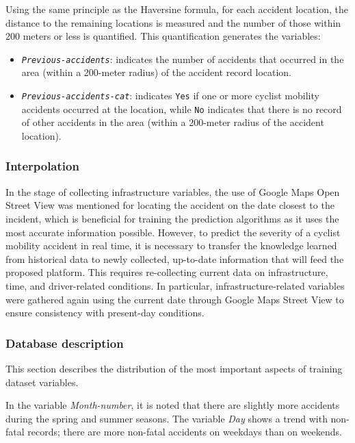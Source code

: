 \documentclass[preprint,12pt]{elsarticle}
\begin{document}
Using the same principle as the Haversine formula, for each accident location, the distance to the remaining locations is measured and the number of those within 200 meters or less is quantified. This quantification generates the variables:
\begin{itemize}
    \item \textit{\texttt{Previous-accidents}}: indicates the number of accidents that occurred in the area (within a 200-meter radius) of the accident record location.
    \item \textit{\texttt{Previous-accidents-cat}}: indicates \texttt{Yes} if one or more cyclist mobility accidents occurred at the location, while \texttt{No} indicates that there is no record of other accidents in the area (within a 200-meter radius of the accident location).
  \end{itemize}




\subsubsection{Interpolation}
In the stage of collecting infrastructure variables, the use of Google Maps Open Street View was mentioned for locating the accident on the date closest to the incident, which is beneficial for training the prediction algorithms as it uses the most accurate information possible. However, to predict the severity of a cyclist mobility accident in real time, it is necessary to transfer the knowledge learned from historical data to newly collected, up-to-date information that will feed the proposed platform. This requires re-collecting current data on infrastructure, time, and driver-related conditions. In particular, infrastructure-related variables were gathered again using the current date through Google Maps Street View to ensure consistency with present-day conditions.

\subsubsection{Database description}
This section describes the  distribution of the most important aspects of training dataset variables. 

In the variable \textit{Month-number}, it is noted that there are slightly more accidents during the spring and summer seasons. The variable \textit{Day} shows a trend with non-fatal records; there are more non-fatal accidents on weekdays than on weekends.
\end{document}
